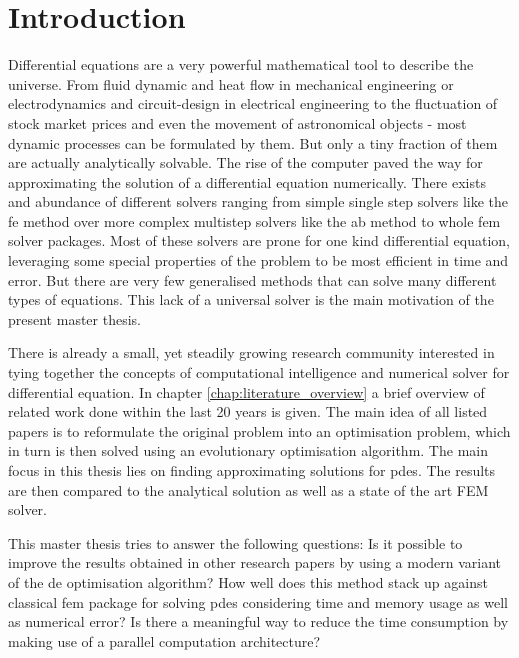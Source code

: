 \documentclass[./\jobname.tex]{subfiles}
\begin{document}
\chapter{Introduction}

Differential equations are a very powerful mathematical tool to describe the universe. From fluid dynamic and heat flow in mechanical engineering or electrodynamics and circuit-design in electrical engineering to the fluctuation of stock market prices and even the movement of astronomical objects - most dynamic processes can be formulated by them. But only a tiny fraction of them are actually analytically solvable. The rise of the computer paved the way for approximating the solution of a differential equation numerically. There exists and abundance of different solvers ranging from simple single step solvers like the \gls{fe} method over more complex multistep solvers like the \gls{ab} method to whole \gls{fem} solver packages. Most of these solvers are prone for one kind differential equation, leveraging some special properties of the problem to be most efficient in time and error. But there are very few generalised methods that can solve many different types of equations. This lack of a universal solver is the main motivation of the present master thesis.

There is already a small, yet steadily growing research community interested in tying together the concepts of computational intelligence and numerical solver for differential equation. In chapter \ref{chap:literature_overview} a brief overview of related work done within the last 20 years is given. The main idea of all listed papers is to reformulate the original problem into an optimisation problem, which in turn is then solved using an evolutionary optimisation algorithm. The main focus in this thesis lies on finding approximating solutions for \gls{pde}s. The results are then compared to the analytical solution as well as a state of the art FEM solver.  

This master thesis tries to answer the following questions: 
Is it possible to improve the results obtained in other research papers by using a modern variant of the \gls{de} optimisation algorithm? How well does this method stack up against classical \gls{fem} package for solving \gls{pde}s considering time and memory usage as well as numerical error? Is there a meaningful way to reduce the time consumption by making use of a parallel computation architecture? 
\end{document}
